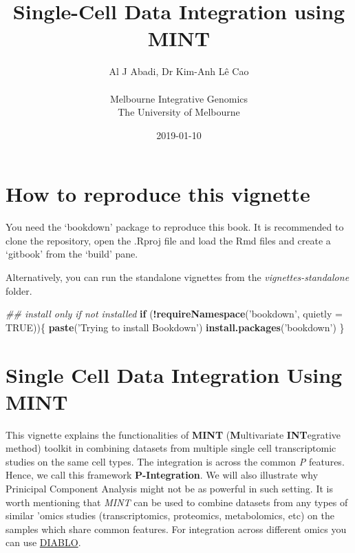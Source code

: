 \documentclass[]{book}
\title{Single-Cell Data Integration using MINT}
\author{Al J Abadi, Dr Kim-Anh Lê Cao\\
~\\
Melbourne Integrative Genomics\\
The University of Melbourne}
\date{2019-01-10}
\newenvironment{Shaded}{\begin{snugshade}}{\end{snugshade}}
\newcommand{\CommentTok}[1]{\textcolor[rgb]{0.56,0.35,0.01}{\textit{#1}}}
\newcommand{\ControlFlowTok}[1]{\textcolor[rgb]{0.13,0.29,0.53}{\textbf{#1}}}
\newcommand{\DataTypeTok}[1]{\textcolor[rgb]{0.13,0.29,0.53}{#1}}
\newcommand{\KeywordTok}[1]{\textcolor[rgb]{0.13,0.29,0.53}{\textbf{#1}}}
\newcommand{\NormalTok}[1]{#1}
\newcommand{\OperatorTok}[1]{\textcolor[rgb]{0.81,0.36,0.00}{\textbf{#1}}}
\newcommand{\OtherTok}[1]{\textcolor[rgb]{0.56,0.35,0.01}{#1}}
\newcommand{\StringTok}[1]{\textcolor[rgb]{0.31,0.60,0.02}{#1}}
\theoremstyle{definition}
\theoremstyle{definition}
\theoremstyle{definition}
\theoremstyle{remark}
\begin{document}
\maketitle

{
\setcounter{tocdepth}{1}
\tableofcontents
}
\hypertarget{how-to-reproduce-this-vignette}{%
\chapter*{How to reproduce this
vignette}\label{how-to-reproduce-this-vignette}}

You need the `bookdown' package to reproduce this book. It is
recommended to clone the repository, open the .Rproj file and load the
Rmd files and create a `gitbook' from the `build' pane.

Alternatively, you can run the standalone vignettes from the
\emph{vignettes-standalone} folder.

\begin{Shaded}
\begin{Highlighting}[]
\CommentTok{## install only if not installed}
\ControlFlowTok{if}\NormalTok{ (}\OperatorTok{!}\KeywordTok{requireNamespace}\NormalTok{(}\StringTok{'bookdown'}\NormalTok{, }\DataTypeTok{quietly =} \OtherTok{TRUE}\NormalTok{))\{}
  \KeywordTok{paste}\NormalTok{(}\StringTok{'Trying to install Bookdown'}\NormalTok{)}
  \KeywordTok{install.packages}\NormalTok{(}\StringTok{'bookdown'}\NormalTok{)}
\NormalTok{\}}
\end{Highlighting}
\end{Shaded}

\hypertarget{single-cell-data-integration-using-mint}{%
\chapter{Single Cell Data Integration Using
MINT}\label{single-cell-data-integration-using-mint}}

This vignette explains the functionalities of \textbf{MINT}
(\textbf{M}ultivariate \textbf{INT}egrative method) \citep{mint} toolkit
in combining datasets from multiple single cell transcriptomic studies
on the same cell types. The integration is across the common \emph{P}
features. Hence, we call this framework \textbf{P-Integration}. We will
also illustrate why Prinicipal Component Analysis might not be as
powerful in such setting. It is worth mentioning that \emph{MINT} can be
used to combine datasets from any types of similar 'omics studies
(transcriptomics, proteomics, metabolomics, etc) on the samples which
share common features. For integration across different omics you can
use \href{http://mixomics.org/mixdiablo/}{DIABLO}.
\end{document}
